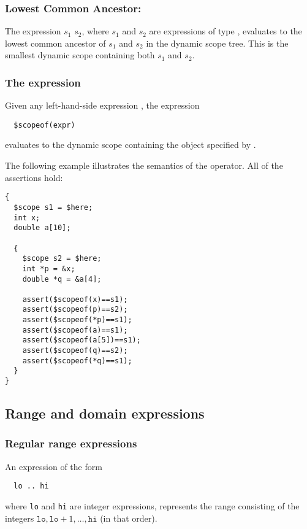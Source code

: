 \subsubsection{Lowest Common Ancestor: \ct{+}}

The expression $s_1$ \ct{+} $s_2$, where $s_1$ and $s_2$ are
expressions of type \cscope, evaluates to the lowest common ancestor
of $s_1$ and $s_2$ in the dynamic scope tree. This is the smallest
dynamic scope containing both $s_1$ and $s_2$.

\subsubsection{The \cscopeof{} expression}

Given any left-hand-side expression , the expression
\begin{verbatim}
  $scopeof(expr)
\end{verbatim}
evaluates to the dynamic scope containing the object specified by
.

The following example illustrates the semantics of the \cscopeof{}
operator.  All of the assertions hold:
\begin{verbatim}
{
  $scope s1 = $here;
  int x;
  double a[10];

  {
    $scope s2 = $here;
    int *p = &x;
    double *q = &a[4];

    assert($scopeof(x)==s1);
    assert($scopeof(p)==s2);
    assert($scopeof(*p)==s1);
    assert($scopeof(a)==s1);
    assert($scopeof(a[5])==s1);
    assert($scopeof(q)==s2);
    assert($scopeof(*q)==s1);
  }
}  
\end{verbatim}

\subsection{Range and domain expressions}

\subsubsection{Regular range expressions}
\label{sec:range_expr}

An expression of the form
\begin{verbatim}
  lo .. hi
\end{verbatim}
where \texttt{lo} and \texttt{hi} are integer expressions, represents
the range consisting of the integers $\texttt{lo}, \texttt{lo}+1,
\ldots, \texttt{hi}$ (in that order).


